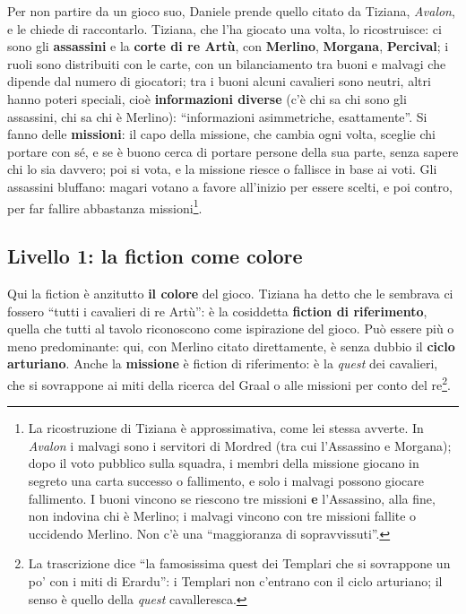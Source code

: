 Per non partire da un gioco suo, Daniele prende quello citato da Tiziana, \emph{Avalon}, e le
chiede di raccontarlo. Tiziana, che l'ha giocato una volta, lo ricostruisce: ci sono gli
\textbf{assassini} e la \textbf{corte di re Artù}, con \textbf{Merlino}, \textbf{Morgana},
\textbf{Percival}; i ruoli sono distribuiti con le carte, con un bilanciamento tra buoni e
malvagi che dipende dal numero di giocatori; tra i buoni alcuni cavalieri sono neutri, altri hanno
poteri speciali, cioè \textbf{informazioni diverse} (c'è chi sa chi sono gli assassini, chi sa chi
è Merlino): ``informazioni asimmetriche, esattamente''. Si fanno delle \textbf{missioni}: il capo
della missione, che cambia ogni volta, sceglie chi portare con sé, e se è buono cerca di portare
persone della sua parte, senza sapere chi lo sia davvero; poi si vota, e la missione riesce o
fallisce in base ai voti. Gli assassini bluffano: magari votano a favore all'inizio per essere
scelti, e poi contro, per far fallire abbastanza missioni\footnote{La ricostruzione di Tiziana è
approssimativa, come lei stessa avverte. In \emph{Avalon} i malvagi sono i servitori di Mordred
(tra cui l'Assassino e Morgana); dopo il voto pubblico sulla squadra, i membri della missione
giocano in segreto una carta successo o fallimento, e solo i malvagi possono giocare
fallimento. I buoni vincono se riescono tre missioni \textbf{e} l'Assassino, alla fine, non
indovina chi è Merlino; i malvagi vincono con tre missioni fallite o uccidendo Merlino. Non c'è
una ``maggioranza di sopravvissuti''.}.

\subsection{Livello 1: la fiction come colore}

Qui la fiction è anzitutto \textbf{il colore} del gioco. Tiziana ha detto che le sembrava ci
fossero ``tutti i cavalieri di re Artù'': è la cosiddetta \textbf{fiction di riferimento}, quella
che tutti al tavolo riconoscono come ispirazione del gioco. Può essere più o meno predominante:
qui, con Merlino citato direttamente, è senza dubbio il \textbf{ciclo arturiano}. Anche la
\textbf{missione} è fiction di riferimento: è la \emph{quest} dei cavalieri, che si sovrappone ai
miti della ricerca del Graal o alle missioni per conto del re\footnote{La trascrizione dice ``la
famosissima quest dei Templari che si sovrappone un po' con i miti di Erardu'': i Templari non
c'entrano con il ciclo arturiano; il senso è quello della \emph{quest} cavalleresca.}.

